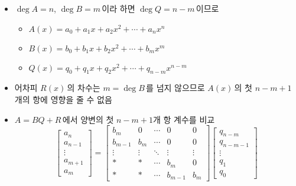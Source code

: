 \begin{frame}
    \begin{itemize}
        \setlength{\itemsep}{0.8em}
        \item \(\deg A = n\), \(\deg B = m\)\,이라 하면 \(\deg Q = n - m\)\,이므로 \pause
              \begin{itemize}
                  \item \(A(x) = a_0 + a_1 x + a_2 x^2 + \cdots + a_{n} x^{n}\)
                  \item \(B(x) = b_0 + b_1 x + b_2 x^2 + \cdots + b_{m} x^{m}\)
                  \item \(Q(x) = q_0 + q_1 x + q_2 x^2 + \cdots + q_{n - m} x^{n - m}\)
              \end{itemize}
              \pause
        \item 어차피 \(R(x)\)\,의 차수는 \(m = \deg B\)\,를 넘지 않으므로 \(A(x)\)\,의 첫 \(n - m + 1\)\,개의 항에 영향을 줄 수 없음 \pause
        \item \(A = BQ + R\)\,에서 양변의 첫 \(n - m + 1\)개 항 계수를 비교
              \[
                  \begin{bmatrix}
                      a_n \\ a_{n - 1} \\ \vdots \\ a_{m + 1} \\ a_m
                  \end{bmatrix} = \begin{bmatrix}
                      b_m       & 0      & \cdots & 0         & 0      \\
                      b_{m - 1} & b_m    & \cdots & 0         & 0      \\
                      \vdots    & \vdots & \ddots & \vdots    & \vdots \\
                      \ast      & \ast   & \cdots & b_m       & 0      \\
                      \ast      & \ast   & \cdots & b_{m - 1} & b_m
                  \end{bmatrix} \begin{bmatrix}
                      q_{n - m} \\ q_{n - m - 1} \\ \vdots \\ q_1 \\ q_0
                  \end{bmatrix}
              \]
    \end{itemize}
\end{frame}

